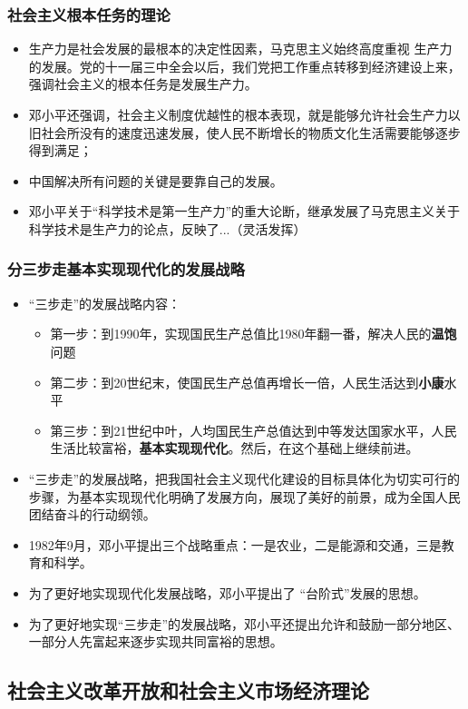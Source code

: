 \documentclass[12pt,openany]{ctexbook}
\begin{document}
\subsubsection{社会主义根本任务的理论}
\begin{itemize}
  \item 生产力是社会发展的最根本的决定性因素，马克思主义始终高度重视 生产力的发展。党的十一届三中全会以后，我们党把工作重点转移到经济建设上来，强调社会主义的根本任务是发展生产力。
  \item 邓小平还强调，社会主义制度优越性的根本表现，就是能够允许社会生产力以旧社会所没有的速度迅速发展，使人民不断增长的物质文化生活需要能够逐步得到满足；
  \item 中国解决所有问题的关键是要靠自己的发展。
  \item 邓小平关于“科学技术是第一生产力”的重大论断，继承发展了马克思主义关于科学技术是生产力的论点，反映了...（灵活发挥）
\end{itemize}
\subsubsection{分三步走基本实现现代化的发展战略}
\begin{itemize}
  \item “三步走”的发展战略内容：
\begin{itemize}
  \item 第一步：到1990年，实现国民生产总值比1980年翻一番，解决人民的\textbf{温饱}问题
  \item 第二步：到20世纪末，使国民生产总值再增长一倍，人民生活达到\textbf{小康}水平
  \item 第三步：到21世纪中叶，人均国民生产总值达到中等发达国家水平，人民生活比较富裕，\textbf{基本实现现代化}。然后，在这个基础上继续前进。
\end{itemize}
  \item “三步走”的发展战略，把我国社会主义现代化建设的目标具体化为切实可行的步骤，为基本实现现代化明确了发展方向，展现了美好的前景，成为全国人民团结奋斗的行动纲领。
  \item 1982年9月，邓小平提出三个战略重点：一是农业，二是能源和交通，三是教育和科学。
  \item 为了更好地实现现代化发展战略，邓小平提出了 “台阶式”发展的思想。
  \item 为了更好地实现“三步走”的发展战略，邓小平还提出允许和鼓励一部分地区、一部分人先富起来逐步实现共同富裕的思想。
\end{itemize}
\subsection{社会主义改革开放和社会主义市场经济理论}
\end{document}
